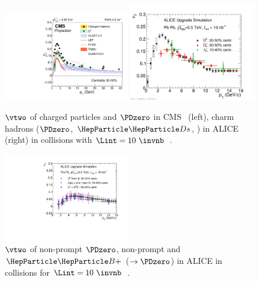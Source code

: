 \begin{figure}[ht]
  \begin{center}
    \includegraphics[width=0.49\textwidth]{hf/figures/cV2_lumiMB_0_wTheory_right.pdf}
   \includegraphics[width=0.49\textwidth]{hf/figures/ALICEUpgrade_charmv2.pdf}
    \caption{$\vtwo$ of charged particles and $\PDzero$ in CMS~\cite{CMS-PAS-FTR-17-002} (left), charm hadrons ($\PDzero$, $\PDs$, \PGLc) in ALICE (right) in \PbPb collisions with $\Lint=10~\invnb$~\cite{Abelev:1625842}.}
    \label{fig:RAAv2.v2charm}
  \end{center}
\end{figure}
\begin{figure}[ht]
  \begin{center}
    \includegraphics[width=0.49\textwidth]{hf/figures/ALICEUpgrade_beautyv2.pdf}
    \caption{$\vtwo$ of non-prompt $\PDzero$, non-prompt \PJGy and $\PBp$ ($\rightarrow \PDzero$) in ALICE in \PbPb collisions for $\Lint=10~\invnb$~\cite{Abelev:1625842}.}
    \label{fig:RAAv2.v2beauty}
  \end{center}
\end{figure}


